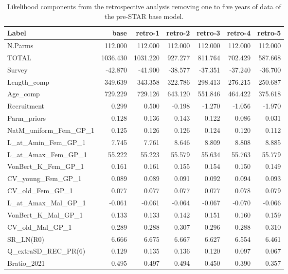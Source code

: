 \documentclass[11pt,
  english,
]{article}
\begin{document}
\begin{landscape}\begin{table}

\caption{\label{tab:retro}Likelihood components from the retrospective analysis removing one to five years of data of the pre-STAR base model.}
\centering
\begin{tabular}[t]{lrrrrrr}
\toprule
Label & base & retro-1 & retro-2 & retro-3 & retro-4 & retro-5\\
\midrule
N.Parms & 112.000 & 112.000 & 112.000 & 112.000 & 112.000 & 112.000\\
TOTAL & 1036.430 & 1031.220 & 927.277 & 811.764 & 702.429 & 587.668\\
Survey & -42.870 & -41.900 & -38.577 & -37.351 & -37.240 & -36.700\\
Length\_comp & 349.639 & 343.358 & 322.786 & 298.413 & 276.215 & 250.687\\
Age\_comp & 729.229 & 729.126 & 643.120 & 551.846 & 464.422 & 375.618\\
Recruitment & 0.299 & 0.500 & -0.198 & -1.270 & -1.056 & -1.970\\
Parm\_priors & 0.128 & 0.136 & 0.143 & 0.122 & 0.086 & 0.031\\
NatM\_uniform\_Fem\_GP\_1 & 0.125 & 0.126 & 0.126 & 0.124 & 0.120 & 0.112\\
L\_at\_Amin\_Fem\_GP\_1 & 7.745 & 7.761 & 8.646 & 8.809 & 8.808 & 8.885\\
L\_at\_Amax\_Fem\_GP\_1 & 55.222 & 55.223 & 55.579 & 55.634 & 55.763 & 55.779\\
VonBert\_K\_Fem\_GP\_1 & 0.161 & 0.161 & 0.155 & 0.154 & 0.150 & 0.149\\
CV\_young\_Fem\_GP\_1 & 0.089 & 0.089 & 0.091 & 0.092 & 0.094 & 0.093\\
CV\_old\_Fem\_GP\_1 & 0.077 & 0.077 & 0.077 & 0.077 & 0.078 & 0.079\\
L\_at\_Amax\_Mal\_GP\_1 & -0.061 & -0.061 & -0.064 & -0.067 & -0.070 & -0.066\\
VonBert\_K\_Mal\_GP\_1 & 0.133 & 0.133 & 0.142 & 0.151 & 0.160 & 0.159\\
CV\_old\_Mal\_GP\_1 & -0.289 & -0.288 & -0.307 & -0.296 & -0.288 & -0.310\\
SR\_LN(R0) & 6.666 & 6.675 & 6.667 & 6.627 & 6.554 & 6.461\\
Q\_extraSD\_REC\_PR(6) & 0.129 & 0.135 & 0.136 & 0.120 & 0.097 & 0.067\\
Bratio\_2021 & 0.495 & 0.497 & 0.494 & 0.450 & 0.390 & 0.357\\

\end{tabular}
\end{table}
\end{landscape}
\end{document}
